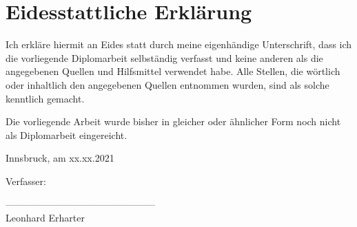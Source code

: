\section*{Eidesstattliche Erklärung}

Ich erkläre hiermit an Eides statt durch meine eigenhändige Unterschrift, dass ich die vorliegende Diplomarbeit selbständig verfasst und keine anderen als die angegebenen Quellen und Hilfsmittel verwendet habe. Alle Stellen, die wörtlich oder inhaltlich den angegebenen Quellen entnommen wurden, sind als solche kenntlich gemacht.

Die vorliegende Arbeit wurde bisher in gleicher oder ähnlicher Form noch nicht als Diplomarbeit eingereicht.

Innsbruck, am xx.xx.2021

\vspace*{3cm}



Verfasser:

\vspace*{2cm}


-----------------------------------------------\\
\hspace*{1.3cm}           Leonhard Erharter

\newpage